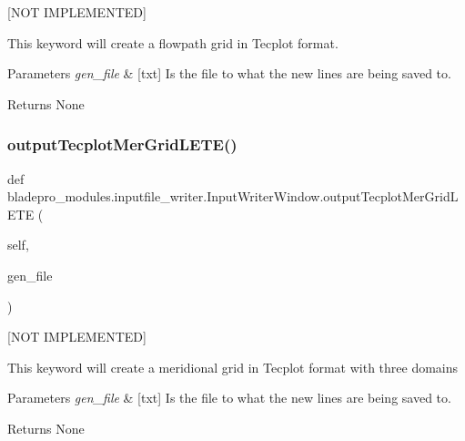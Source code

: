 \mbox{[}N\+OT I\+M\+P\+L\+E\+M\+E\+N\+T\+ED\mbox{]} 

This keyword will create a flowpath grid in Tecplot format.


\begin{DoxyParams}{Parameters}
{\em gen\+\_\+file} & \mbox{[}txt\mbox{]} Is the file to what the new lines are being saved to. \\
\hline
\end{DoxyParams}
\begin{DoxyReturn}{Returns}
None 
\end{DoxyReturn}
\hypertarget{classbladepro__modules_1_1inputfile__writer_1_1_input_writer_window_a504ccb848106dd7a0a4148941e2ec6d9}{}\label{classbladepro__modules_1_1inputfile__writer_1_1_input_writer_window_a504ccb848106dd7a0a4148941e2ec6d9} 
\subsubsection{\texorpdfstring{output\+Tecplot\+Mer\+Grid\+L\+E\+T\+E()}{outputTecplotMerGridLETE()}}
{\footnotesize\ttfamily def bladepro\+\_\+modules.\+inputfile\+\_\+writer.\+Input\+Writer\+Window.\+output\+Tecplot\+Mer\+Grid\+L\+E\+TE (\begin{DoxyParamCaption}\item[{}]{self,  }\item[{}]{gen\+\_\+file }\end{DoxyParamCaption})}



\mbox{[}N\+OT I\+M\+P\+L\+E\+M\+E\+N\+T\+ED\mbox{]} 

This keyword will create a meridional grid in Tecplot format with three domains


\begin{DoxyParams}{Parameters}
{\em gen\+\_\+file} & \mbox{[}txt\mbox{]} Is the file to what the new lines are being saved to. \\
\hline
\end{DoxyParams}
\begin{DoxyReturn}{Returns}
None 
\end{DoxyReturn}
\hypertarget{classbladepro__modules_1_1inputfile__writer_1_1_input_writer_window_adb8d68c4190d41bd93a2988562f6495b}{}\label{classbladepro__modules_1_1inputfile__writer_1_1_input_writer_window_adb8d68c4190d41bd93a2988562f6495b} 

